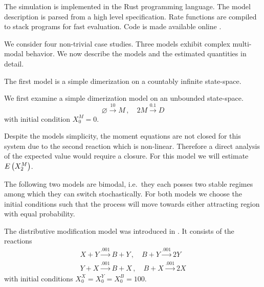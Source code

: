 The simulation is implemented in the Rust programming language.
The model description is parsed from a high level specification. 
Rate functions are compiled to stack programs for fast evaluation.
Code is made available online \parencite{cme-simulation-github}.

We consider four non-trivial case studies. Three models exhibit complex multi-modal behavior.
We now describe the models and the estimated quantities in detail.

The first model is a simple dimerization on a countably infinite state-space.
\begin{model}[Dimerization]\label{model:dim2}
We first examine a simple dimerization model on an unbounded state-space.
	\[\varnothing\xrightarrow{10}M\,,\quad 2M\xrightarrow{0.1}D\]
with initial condition $X_0^M=0$.
\end{model}
Despite the models simplicity, the moment equations are not closed for this system
due to the second reaction which is non-linear.
Therefore a direct analysis of the expected value would require a closure.
For this model we will estimate ${E}\left(X^M_2\right)$.

The following two models are bimodal, i.e.\ they each posses two stable regimes
among which they can switch stochastically.
For both models we choose the initial conditions such that the process
will move towards either attracting region with equal probability.
\begin{model}\label{model:dm}
The distributive modification model was introduced in \parencite{cardelli2012cell}.
It consists of the reactions
\begin{gather*}
	X + Y \xrightarrow{\num{.001}} B + Y\,,\quad
	B + Y \xrightarrow{\num{.001}} 2 Y\\
	Y + X \xrightarrow{\num{.001}} B + X\,,\quad
	B + X \xrightarrow{\num{.001}} 2 X
\end{gather*}
with initial conditions $X^X_0=X^Y_0=X^B_0=100$.
\end{model}


